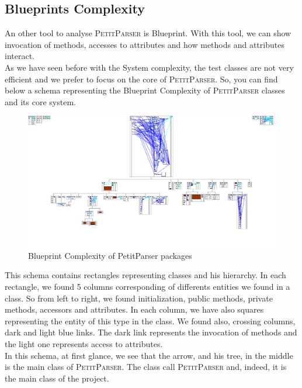 \subsection{Blueprints Complexity}
An other tool to analyse \textsc{PetitParser} is Blueprint.  With this tool, we can show invocation of methods, accesses to attributes and how methods and attributes interact.\\
As we have seen before with the System complexity, the test classes are not very efficient and we prefer to focus on the core of \textsc{PetitParser}.  So, you can find below a schema representing the Blueprint Complexity of \textsc{PetitParser} classes and its core system.\\
\begin{figure}[ht]
\label{blueprint_system}
\includegraphics[scale=0.35]{blueprint_petit_parser.png}
\caption{Blueprint Complexity of PetitParser packages}
\end{figure}
This schema contains rectangles representing classes and his hierarchy.  In each rectangle, we found 5 columns corresponding of differents entities we found in a class.  So from left to right, we found initialization, public methods, private methods, accessors and attributes.  In each column, we have also squares representing the entity of this type in the class.  We found also, crossing columns, dark and light blue links.  The dark link represents the invocation of methods and the light one represents access to attributes.\\
In this schema, at first glance, we see that the arrow, and his tree, in the middle is the main class of \textsc{PetitParser}.  The class call \textsc{PetitParser} and, indeed, it is the main class of the project. 
